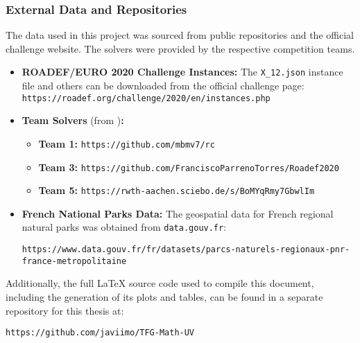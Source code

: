 \subsubsection*{External Data and Repositories}

The data used in this project was sourced from public repositories and the official challenge website. The solvers were provided by the respective competition teams.
\begin{itemize}
    \item \textbf{ROADEF/EURO 2020 Challenge Instances:} The \texttt{X\_12.json} instance file and others can be downloaded from the official challenge page: \\ \texttt{https://roadef.org/challenge/2020/en/instances.php}
    \item \textbf{Team Solvers} (from \cite{top1, ConsueloRoadef, top5})\textbf{:}
        \begin{itemize}
            \item \textbf{Team 1:} \texttt{https://github.com/mbmv7/rc}
            \item \textbf{Team 3:} \texttt{https://github.com/FranciscoParrenoTorres/Roadef2020}
            \item \textbf{Team 5:} \texttt{https://rwth-aachen.sciebo.de/s/BoMYqRmy7GbwlIm}
        \end{itemize}
    \item \textbf{French National Parks Data:} The geospatial data for French regional natural parks was obtained from \texttt{data.gouv.fr}: 
    \begin{adjustwidth}{-1.5cm}{0cm}
    \texttt{https://www.data.gouv.fr/fr/datasets/parcs-naturels-regionaux-pnr-france-metropolitaine}
    \end{adjustwidth}

\end{itemize}

Additionally, the full LaTeX source code used to compile this document, including the generation of its plots and tables, can be found in a separate repository for this thesis at:
\begin{center}
    \texttt{https://github.com/javiimo/TFG-Math-UV}
\end{center}